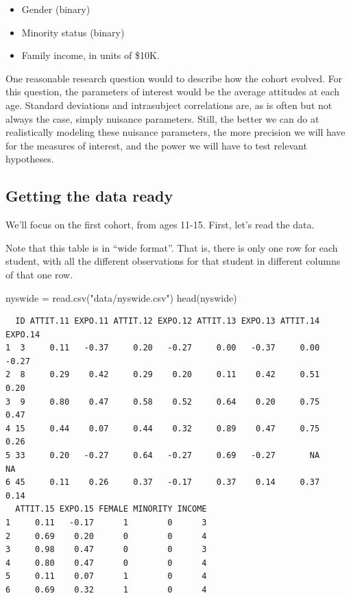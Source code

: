 \documentclass[
  letterpaper,
  DIV=11,
  numbers=noendperiod]{scrreprt}
\newenvironment{Shaded}{}{}
\newcommand{\FunctionTok}[1]{\textcolor[rgb]{0.02,0.16,0.49}{#1}}
\newcommand{\NormalTok}[1]{#1}
\newcommand{\OtherTok}[1]{\textcolor[rgb]{0.00,0.44,0.13}{#1}}
\newcommand{\StringTok}[1]{\textcolor[rgb]{0.25,0.44,0.63}{#1}}
\providecommand{\tightlist}{%
  \setlength{\itemsep}{0pt}\setlength{\parskip}{0pt}}\usepackage{longtable,booktabs,array}
\begin{document}
\begin{itemize}
\tightlist
\item
  Gender (binary)
\item
  Minority status (binary)
\item
  Family income, in units of \$10K.
\end{itemize}

One reasonable research question would to describe how the cohort
evolved. For this question, the parameters of interest would be the
average attitudes at each age. Standard deviations and intrasubject
correlations are, as is often but not always the case, simply nuisance
parameters. Still, the better we can do at realistically modeling these
nuisance parameters, the more precision we will have for the measures of
interest, and the power we will have to test relevant hypotheses.

\subsection{Getting the data ready}\label{getting-the-data-ready-1}

We'll focus on the first cohort, from ages 11-15. First, let's read the
data.

Note that this table is in ``wide format''. That is, there is only one
row for each student, with all the different observations for that
student in different columns of that one row.

\begin{Shaded}
\begin{Highlighting}[]
\NormalTok{nyswide }\OtherTok{=} \FunctionTok{read.csv}\NormalTok{(}\StringTok{"data/nyswide.csv"}\NormalTok{)}
\FunctionTok{head}\NormalTok{(nyswide)}
\end{Highlighting}
\end{Shaded}

\begin{verbatim}
  ID ATTIT.11 EXPO.11 ATTIT.12 EXPO.12 ATTIT.13 EXPO.13 ATTIT.14 EXPO.14
1  3     0.11   -0.37     0.20   -0.27     0.00   -0.37     0.00   -0.27
2  8     0.29    0.42     0.29    0.20     0.11    0.42     0.51    0.20
3  9     0.80    0.47     0.58    0.52     0.64    0.20     0.75    0.47
4 15     0.44    0.07     0.44    0.32     0.89    0.47     0.75    0.26
5 33     0.20   -0.27     0.64   -0.27     0.69   -0.27       NA      NA
6 45     0.11    0.26     0.37   -0.17     0.37    0.14     0.37    0.14
  ATTIT.15 EXPO.15 FEMALE MINORITY INCOME
1     0.11   -0.17      1        0      3
2     0.69    0.20      0        0      4
3     0.98    0.47      0        0      3
4     0.80    0.47      0        0      4
5     0.11    0.07      1        0      4
6     0.69    0.32      1        0      4
\end{verbatim}
\end{document}
